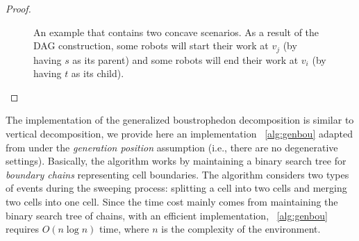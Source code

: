 \begin{proof}
\begin{figure} [ht]
    \caption{An example that contains two concave scenarios. As a result of the DAG construction, some robots will
    start their work at $v_j$ (by having $s$ as its parent) and some robots will end their work at $v_i$ (by having $t$ as its child).}
    \label{fig:sc-concave_vertices}
\end{figure}
\end{proof}




The implementation of the generalized boustrophedon decomposition is similar 
to vertical decomposition, we provide here an implementation 
~\ref{alg:genbou} adapted from \cite{lavalle2006sweepline} under the 
\emph{generation position} assumption (i.e., there are no degenerative 
settings).
%
Basically, the algorithm works by maintaining a binary search tree for 
\emph{boundary chains} representing cell boundaries. The algorithm considers 
two types of events during the sweeping process: splitting a cell into two 
cells and merging two cells into one cell.
%
Since the time cost mainly comes from maintaining the binary search tree of 
chains, with an efficient implementation, ~\ref{alg:genbou} requires 
$O(n \log n)$ time, where $n$ is the complexity of the environment. 


